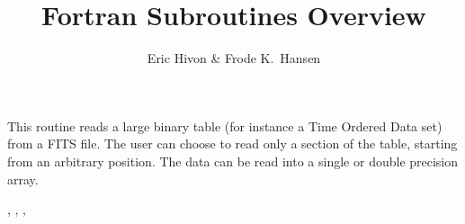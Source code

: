 
\sloppy


\title{\healpix Fortran Subroutines Overview}
 \section[input\_tod*]{ }
\label{sub:input_tod}
\author{Eric Hivon \& Frode K.~Hansen}

\begin{facility}
{This routine reads a large binary table (for instance a Time Ordered Data
 set) from a FITS file. The user can choose to read only a section of the table,
 starting from an arbitrary position. 
The data can be read into a single or double precision array.}
{\modFitstools}
\end{facility}

\begin{f90format}
{%
, %
, %
, %
 }
\end{f90format}
\aboutoptional

